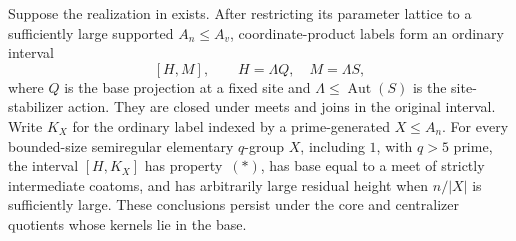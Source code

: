 \begin{lemma}\label{r:site-normal}
Suppose the realization in  exists.
After restricting its parameter lattice to a sufficiently large
supported $A_n\le A_v$, coordinate-product labels form an ordinary
interval
\[
 [H,M],\qquad H=\Lambda Q,\quad M=\Lambda S,
\]
where $Q$ is the base projection at a fixed site and
$\Lambda\le\operatorname{Aut}(S)$ is the site-stabilizer action.
They are closed under meets and joins in the original interval.
Write $K_X$ for the ordinary label indexed by a prime-generated
$X\le A_n$.  For every bounded-size semiregular elementary $q$-group
$X$, including $1$, with $q>5$ prime, the interval $[H,K_X]$ has
property~\((*)\), has base equal to a meet of strictly intermediate
coatoms, and has arbitrarily large residual height when $n/|X|$
is sufficiently large.  These conclusions persist under the core
and centralizer quotients whose kernels lie in the base.
\end{lemma}

